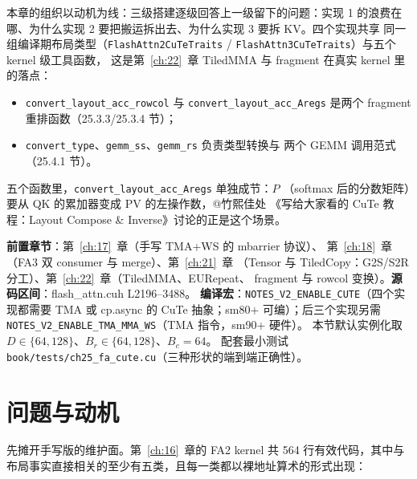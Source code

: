本章的组织以动机为线：三级搭建逐级回答上一级留下的问题：实现 1
的浪费在哪、为什么实现 2 要把搬运拆出去、为什么实现 3 要拆 KV。四个实现共享
同一组编译期布局类型（\texttt{Flash\allowbreak{}Attn2\allowbreak{}Cu\allowbreak{}Te\allowbreak{}Traits} /
\texttt{Flash\allowbreak{}Attn3\allowbreak{}Cu\allowbreak{}Te\allowbreak{}Traits}）与五个 kernel 级工具函数，
这是第~\ref{ch:22}~章 TiledMMA 与 fragment 在真实 kernel 里的落点：

\begin{itemize}[itemsep=1pt,topsep=2pt]
  \item \texttt{convert\_\allowbreak{}layout\_\allowbreak{}acc\_\allowbreak{}rowcol} 与 \texttt{convert\_\allowbreak{}layout\_\allowbreak{}acc\_\allowbreak{}Aregs}
        是两个 fragment 重排函数（25.3.3/25.3.4 节）；
  \item \texttt{convert\_\allowbreak{}type}、\texttt{gemm\_ss}、\texttt{gemm\_rs} 负责类型转换与
        两个 GEMM 调用范式（25.4.1 节）。
\end{itemize}

五个函数里，\texttt{convert\_\allowbreak{}layout\_\allowbreak{}acc\_\allowbreak{}Aregs} 单独成节：$P$
（softmax 后的分数矩阵）要从 QK 的累加器变成 PV 的左操作数，@竹熙佳处
《写给大家看的 CuTe 教程：Layout Compose \& Inverse》讨论的正是这个场景。

\textbf{前置章节}：第~\ref{ch:17}~章（手写 TMA+WS 的 mbarrier 协议）、
第~\ref{ch:18}~章（FA3 双 consumer 与 merge）、第~\ref{ch:21}~章
（Tensor 与 TiledCopy：G2S/S2R 分工）、第~\ref{ch:22}~章（TiledMMA、EURepeat、
fragment 与 rowcol 变换）。\textbf{源码区间}：flash\_attn.cuh L2196--3488。
\textbf{编译宏}：\texttt{NOTES\_\allowbreak{}V2\_\allowbreak{}ENABLE\_\allowbreak{}CUTE}（四个实现都需要 TMA 或
cp.async 的 CuTe 抽象；sm80+ 可编）；后三个实现另需
\texttt{NOTES\_\allowbreak{}V2\_\allowbreak{}ENABLE\_\allowbreak{}TMA\_\allowbreak{}MMA\_\allowbreak{}WS}（TMA 指令，sm90+ 硬件）。
本节默认实例化取 $D\in\{64,128\}$、$B_r\in\{64,128\}$、$B_c=64$。
配套最小测试 \texttt{book/\allowbreak{}tests/\allowbreak{}ch25\_\allowbreak{}fa\_\allowbreak{}cute.\allowbreak{}cu}（三种形状的端到端正确性）。

\section{问题与动机}

先摊开手写版的维护面。第~\ref{ch:16}~章的 FA2 kernel 共 564 行有效代码，其中与
布局事实直接相关的至少有五类，且每一类都以裸地址算术的形式出现：

